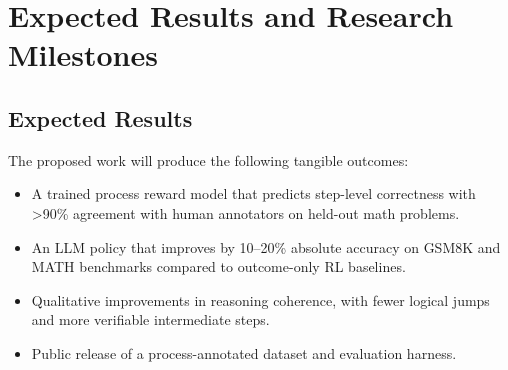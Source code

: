 \documentclass[11pt]{article}
\begin{document}
\section{Expected Results and Research Milestones}
\subsection*{Expected Results}
\noindent The proposed work will produce the following tangible outcomes:\par\vspace{0.4em}
\begin{itemize}[leftmargin=*,itemsep=0.35em,parsep=0pt,topsep=0.35em,partopsep=0pt]
  \item A trained process reward model that predicts step-level correctness with >90\% agreement with human annotators on held-out math problems.
  \item An LLM policy that improves by 10--20\% absolute accuracy on GSM8K and MATH benchmarks compared to outcome-only RL baselines.
  \item Qualitative improvements in reasoning coherence, with fewer logical jumps and more verifiable intermediate steps.
  \item Public release of a process-annotated dataset and evaluation harness.
\end{itemize}
\end{document}
